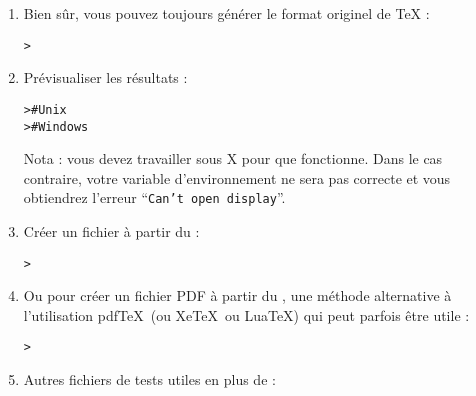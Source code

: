 \documentclass[german, english, french]{article}
\renewcommand{\samp}[1]{\enquote{\texttt{#1}}}
\begin{document}
\begin{enumerate}
\item Bien sûr, vous pouvez toujours générer le format originel \dvi{} de
  \TeX{} :
\begin{alltt}
> 
\end{alltt}

\item Prévisualiser les résultats :
\begin{alltt}
>     # Unix
>   # Windows
\end{alltt}
Nota : vous devez travailler sous X pour que  fonctionne.  Dans le
cas contraire, votre variable d'environnement  ne sera pas
correcte et vous obtiendrez l'erreur \samp{Can't open display}.

\item Créer un fichier \PS{} à partir du \dvi{} :
\begin{alltt}
> 
\end{alltt}

\item Ou pour créer un fichier PDF à partir du \dvi{}, une méthode alternative
  à l'utilisation pdf\TeX\ (ou Xe\TeX\ ou Lua\TeX) qui peut parfois être utile :
\begin{alltt}
> 
\end{alltt}

\item Autres fichiers de tests utiles en plus de  :



\end{enumerate}
\end{document}
